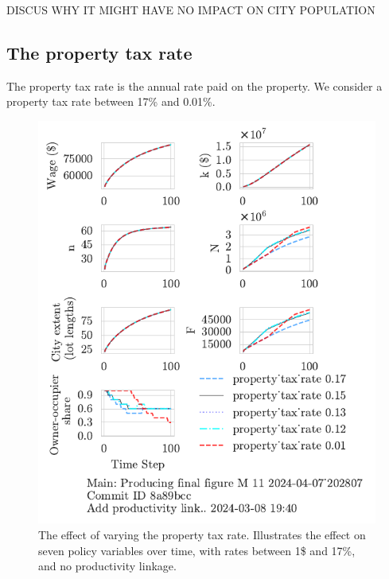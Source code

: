 {\color{red} DISCUS WHY IT MIGHT HAVE NO IMPACT ON CITY POPULATION}

\newpage



\subsection{The property tax rate}

The property tax rate is the annual rate paid on the property. We consider a property tax rate between 17\% and 0.01\%.

\begin{figure}[h!b]
    \centering
    \includegraphics[scale=1.1, trim={0 1.4cm 0 0},clip]{fig/property_tax_with_5_202807.pdf}
    \caption[The effect of varying the property tax rate]{The effect of varying the property tax rate. Illustrates the effect on seven policy variables over time, with rates between 1\$ and 17\%, and no productivity linkage.}
    \label{fig:property_tax_ownership_trajectory}
\end{figure}


